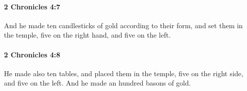 		\paragraph{2 Chronicles 4:7} %
			\label{2CHRONICLES-4-7}

			And he made ten candlesticks of gold according to their form, and set them in the temple, five on the right hand, and five on the left.


		\paragraph{2 Chronicles 4:8} %
			\label{2CHRONICLES-4-8}

			He made also ten tables, and placed them in the temple, five on the right side, and five on the left. And he made an hundred basons of gold.


